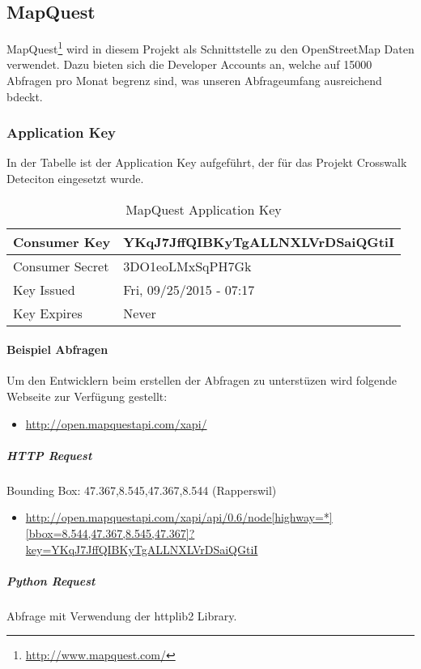 \subsection{MapQuest}
MapQuest\footnote{\url{http://www.mapquest.com/}} wird in diesem Projekt als Schnittstelle zu den OpenStreetMap Daten verwendet. Dazu bieten sich die Developer Accounts an, welche auf 15000 Abfragen pro Monat begrenz sind, was unseren Abfrageumfang ausreichend bdeckt.

\subsubsection{Application Key}
In der Tabelle ist der Application Key aufgeführt, der für das Projekt Crosswalk Deteciton eingesetzt wurde.
\begin{table}[H]
    \begin{tabular}{ | p{6cm} | p{6cm}  | }
    \hline    
	Consumer Key &  YKqJ7JffQIBKyTgALLNXLVrDSaiQGtiI \\ \hline
	Consumer Secret & 3DO1eoLMxSqPH7Gk \\ \hline
	Key Issued & Fri, 09/25/2015 - 07:17 \\ \hline
	Key Expires & Never \\ \hline
    \end{tabular}
    \caption[MapQuest Application Key]{MapQuest Application Key}
\end{table}

\paragraph{Beispiel Abfragen}
Um den Entwicklern beim erstellen der Abfragen zu unterstüzen wird folgende Webseite zur Verfügung gestellt:
\begin{itemize}
	\item \url{http://open.mapquestapi.com/xapi/}
\end{itemize}

\subparagraph{HTTP Request}
Bounding Box:  47.367,8.545,47.367,8.544 (Rapperswil)
\begin{itemize}
	\item \url{http://open.mapquestapi.com/xapi/api/0.6/node[highway=*][bbox=8.544,47.367,8.545,47.367]?key=YKqJ7JffQIBKyTgALLNXLVrDSaiQGtiI}
\end{itemize}

\subparagraph{Python Request} Abfrage mit Verwendung der httplib2 Library. \\ 
\begin{python}
import httplib2

url =  'http://open.mapquestapi.com/xapi/api/0.6/node
		[highway=*][bbox=8.544,47.367,8.545,47.367]?
		key=YKqJ7JffQIBKyTgALLNXLVrDSaiQGtiI}'
resp, content = httplib2.Http().request(url)
\end{python}










